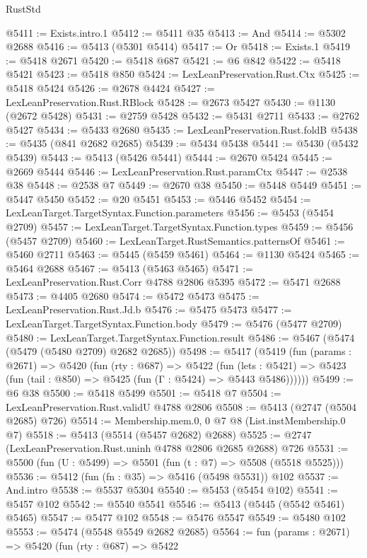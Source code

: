 \begin{lexlean}{RustStd}
\begin{coremodule}
@5411 := Exists.intro.{1}
@5412 := @5411 @35
@5413 := And
@5414 := @5302 @2688
@5416 := @5413 (@5301 @5414)
@5417 := Or
@5418 := Exists.{1}
@5419 := @5418 @2671
@5420 := @5418 @687
@5421 := @6 @842
@5422 := @5418 @5421
@5423 := @5418 @850
@5424 := LexLeanPreservation.Rust.Ctx
@5425 := @5418 @5424
@5426 := @2678 @4424
@5427 := LexLeanPreservation.Rust.RBlock
@5428 := @2673 @5427
@5430 := @1130 (@2672 @5428)
@5431 := @2759 @5428
@5432 := @5431 @2711
@5433 := @2762 @5427
@5434 := @5433 @2680
@5435 := LexLeanPreservation.Rust.foldB
@5438 := @5435 (@841 @2682 @2685)
@5439 := @5434 @5438
@5441 := @5430 (@5432 @5439)
@5443 := @5413 (@5426 @5441)
@5444 := @2670 @5424
@5445 := @2669 @5444
@5446 := LexLeanPreservation.Rust.paramCtx
@5447 := @2538 @38
@5448 := @2538 @7
@5449 := @2670 @38
@5450 := @5448 @5449
@5451 := @5447 @5450
@5452 := @20 @5451
@5453 := @5446 @5452
@5454 := LexLeanTarget.TargetSyntax.Function.parameters
@5456 := @5453 (@5454 @2709)
@5457 := LexLeanTarget.TargetSyntax.Function.types
@5459 := @5456 (@5457 @2709)
@5460 := LexLeanTarget.RustSemantics.patternsOf
@5461 := @5460 @2711
@5463 := @5445 (@5459 @5461)
@5464 := @1130 @5424
@5465 := @5464 @2688
@5467 := @5413 (@5463 @5465)
@5471 := LexLeanPreservation.Rust.Corr @4788 @2806 @5395
@5472 := @5471 @2688
@5473 := @4405 @2680
@5474 := @5472 @5473
@5475 := LexLeanPreservation.Rust.Jd.b
@5476 := @5475 @5473
@5477 := LexLeanTarget.TargetSyntax.Function.body
@5479 := @5476 (@5477 @2709)
@5480 := LexLeanTarget.TargetSyntax.Function.result
@5486 := @5467 (@5474 (@5479 (@5480 @2709) @2682 @2685))
@5498 := @5417
    (@5419
      (fun (params : @2671) =>
      @5420
        (fun (rty : @687) =>
        @5422
          (fun (lets : @5421) =>
          @5423 (fun (tail : @850) => @5425 (fun (Γ : @5424) => @5443 @5486))))))
@5499 := @6 @38
@5500 := @5418 @5499
@5501 := @5418 @7
@5504 := LexLeanPreservation.Rust.validU @4788 @2806
@5508 := @5413 (@2747 (@5504 @2685) @726)
@5514 := Membership.mem.{0, 0} @7 @8 (List.instMembership.{0} @7)
@5518 := @5413 (@5514 (@5457 @2682) @2688)
@5525 := @2747 (LexLeanPreservation.Rust.uninh @4788 @2806 @2685 @2688) @726
@5531 := @5500 (fun (U : @5499) => @5501 (fun (t : @7) => @5508 (@5518 @5525)))
@5536 := @5412 (fun (fn : @35) => @5416 (@5498 @5531)) @102
@5537 := And.intro
@5538 := @5537 @5304
@5540 := @5453 (@5454 @102)
@5541 := @5457 @102
@5542 := @5540 @5541
@5546 := @5413 (@5445 (@5542 @5461) @5465)
@5547 := @5477 @102
@5548 := @5476 @5547
@5549 := @5480 @102
@5553 := @5474 (@5548 @5549 @2682 @2685)
@5564 := fun (params : @2671) =>
  @5420
    (fun (rty : @687) =>
    @5422

\end{coremodule}
\end{lexlean}
